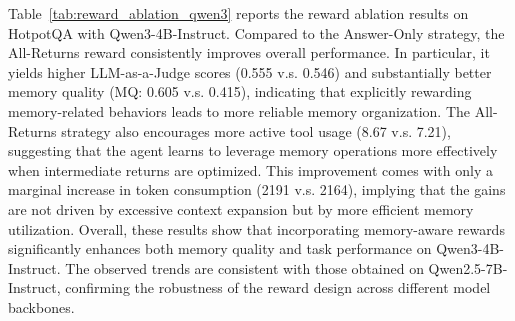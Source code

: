 Table~\ref{tab:reward_ablation_qwen3} reports the reward ablation results on HotpotQA with Qwen3-4B-Instruct. Compared to the Answer-Only strategy, the All-Returns reward consistently improves overall performance. In particular, it yields higher LLM-as-a-Judge scores (0.555 v.s. 0.546) and substantially better memory quality (MQ: 0.605 v.s. 0.415), indicating that explicitly rewarding memory-related behaviors leads to more reliable memory organization. The All-Returns strategy also encourages more active tool usage (8.67 v.s. 7.21), suggesting that the agent learns to leverage memory operations more effectively when intermediate returns are optimized. This improvement comes with only a marginal increase in token consumption (2191 v.s. 2164), implying that the gains are not driven by excessive context expansion but by more efficient memory utilization. Overall, these results show that incorporating memory-aware rewards significantly enhances both memory quality and task performance on Qwen3-4B-Instruct. The observed trends are consistent with those obtained on Qwen2.5-7B-Instruct, confirming the robustness of the reward design across different model backbones.
